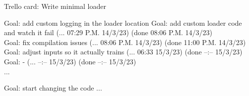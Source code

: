 \documentclass[12pt,oneside]{book}
\begin{document}
  Trello card: Write minimal loader

  Goal: add custom logging in the loader location 
  Goal: add custom loader code and watch it fail (... 07:29 P.M. 14/3/23) (done 08:06 P.M. 14/3/23) \\
  Goal: fix compilation issues (... 08:06 P.M. 14/3/23) (done 11:00 P.M. 14/3/23) \\
  Goal: adjust inputs so it actually trains (... 06:33 15/3/23) (done --:-- 15/3/23) \\
  Goal: - (... --:-- 15/3/23) (done --:-- 15/3/23) \\
  ...

  Goal: start changing the code ... \\
\end{document}
